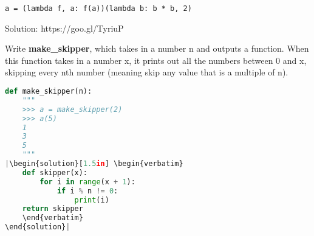 \begin{lstlisting}
a = (lambda f, a: f(a))(lambda b: b * b, 2)
\end{lstlisting}
\begin{solution}
Solution: https://goo.gl/TyriuP
\end{solution}
\newpage
\question
Write \textbf{make\_skipper}, which takes in a number n and outputs a function. When this function takes in a number x, it prints out all the numbers between 0 and x, skipping every nth number (meaning skip any value that is a multiple of n).
\begin{lstlisting}[language=Python]
def make_skipper(n):
    """
    >>> a = make_skipper(2)
    >>> a(5)
    1
    3
    5
    """
|\begin{solution}[1.5in] \begin{verbatim}
    def skipper(x):
        for i in range(x + 1):
            if i % n != 0:
                print(i)
    return skipper
    \end{verbatim}
\end{solution}|
\end{lstlisting}